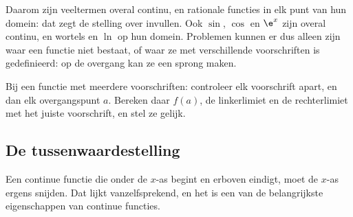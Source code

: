 Daarom zijn veeltermen overal continu, en rationale functies in elk punt van hun domein: dat zegt de stelling over invullen. Ook $\sin$, $\cos$ en $\e^x$ zijn overal continu, en wortels en $\ln$ op hun domein. Problemen kunnen er dus alleen zijn waar een functie niet bestaat, of waar ze met verschillende voorschriften is gedefinieerd: op de overgang kan ze een sprong maken.


\begin{werkwijze}
Bij een functie met meerdere voorschriften: controleer elk voorschrift apart, en dan elk overgangspunt $a$. Bereken daar $f(a)$, de linkerlimiet en de rechterlimiet met het juiste voorschrift, en stel ze gelijk.
\end{werkwijze}

\begin{oefeningen}
\end{oefeningen}

\subsection{De tussenwaardestelling}

Een continue functie die onder de $x$-as begint en erboven eindigt, moet de $x$-as ergens snijden. Dat lijkt vanzelfsprekend, en het is een van de belangrijkste eigenschappen van continue functies.

